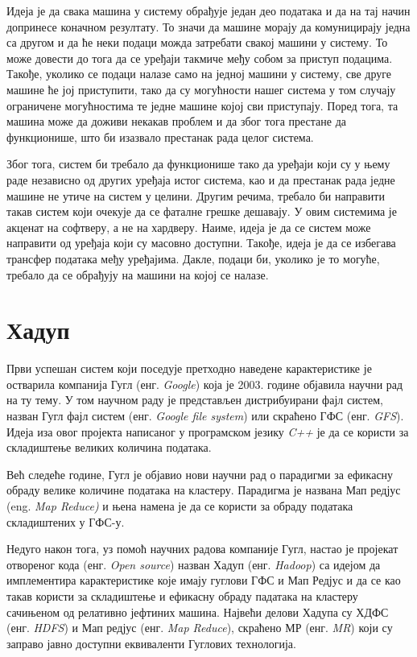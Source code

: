 \documentclass[12pt,oneside]{memoir}
\begin{document}
Идеја је да свака машина у систему обрађује један део података и да на тај начин допринесе коначном резултату. То значи да машине морају да комуницирају једна са другом и да ће неки подаци можда затребати свакој машини у систему. То може довести до тога да се уређаји такмиче међу собом за приступ подацима. Такође, уколико се подаци налазе само на једној машини у систему, све друге машине ће јој приступити, тако да су могућности нашег система у том случају ограничене могућностима те једне машине којој сви приступају. Поред тога, та машина може да доживи некакав проблем и да због тога престане да функционише, што би изазвало престанак рада целог система. \cite{hadoop_beginner}

Због тога, систем би требало да функционише тако да уређаји који су у њему раде независно од других уређаја истог система, као и да престанак рада једне машине не утиче на систем у целини. Другим речима, требало би направити такав систем који очекује да се фаталне грешке дешавају. У овим системима је акценат на софтверу, а не на хардверу. Наиме, идеја је да се систем може направити од уређаја који су масовно доступни. Такође, идеја је да се избегава трансфер података међу уређајима. Дакле, подаци би, уколико је то могуће, требало да се обрађују на машини на којој се налазе. \cite{hadoop_beginner}

\section{Хадуп}
\label{sec:hadoop}

Први успешан систем који поседује претходно наведене карактеристике је остварила компанија Гугл (енг. \textit{Google}) која је 2003. године објавила научни рад на ту тему. У том научном раду је представљен дистрибуирани фајл систем, назван Гугл фајл систем (енг. \textit{Google file system}) или скраћено ГФС (енг. \textit{GFS}). Идеја иза овог пројекта написаног у програмском језику \textit{C++} је да се користи за складиштење великих количина података. \cite{gfs}

Већ следеће године, Гугл је објавио нови научни рад о парадигми за ефикасну обраду велике количине података на кластеру. Парадигма је названа Мап редјус (eng. \textit{Map Reduce)} и њена намена је да се користи за обраду података складиштених у ГФС-у. \cite{gmr}

Недуго након тога, уз помоћ научних радова компаније Гугл, настао је пројекат отвореног кода (енг. \textit{Open source}) назван Хадуп (енг. \textit{Hadoop}) са идејом да имплементира карактеристике које имају гуглови ГФС и Мап Редјус и да се као такав користи за складиштење и ефикасну обраду падатака на кластеру сачињеном од релативно јефтиних машина. Највећи делови Хадупа су ХДФС (енг. \textit{HDFS}) и Мап редјус (енг. \textit{Map Reduce}), скраћено МР (енг. \textit{MR}) који су заправо јавно доступни еквиваленти Гуглових технологија. \cite{hadoop_beginner}
\end{document}
